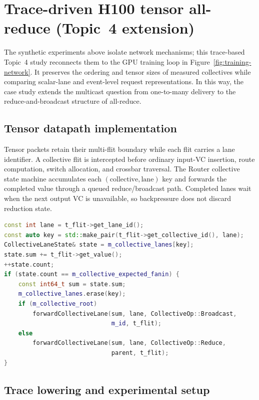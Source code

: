 \documentclass[10pt]{article}
\newcommand{\FloatBarrier}{\par}
\begin{document}
\FloatBarrier

\section{Trace-driven H100 tensor all-reduce (Topic~4 extension)}

The synthetic experiments above isolate network mechanisms; this trace-based
Topic~4 study reconnects them to the GPU training loop in
Figure~\ref{fig:training-network}.  It preserves the ordering and tensor sizes
of measured collectives while comparing scalar-lane and event-level request
representations.  In this way, the case study extends the multicast question
from one-to-many delivery to the reduce-and-broadcast structure of all-reduce.

\subsection{Tensor datapath implementation}

Tensor packets retain their multi-flit boundary while each flit carries a lane
identifier.  A collective flit is intercepted before ordinary input-VC
insertion, route computation, switch allocation, and crossbar traversal.  The
Router collective state machine accumulates each
$(\text{collective},\text{lane})$ key and forwards the completed value through
a queued reduce/broadcast path.  Completed lanes wait when the next output VC
is unavailable, so backpressure does not discard reduction state.

\begin{lstlisting}[language=C++,caption={Abridged source excerpt: lane-wise tensor accumulation (\texttt{Router.cc}).},label={lst:tensor}]
const int lane = t_flit->get_lane_id();
const auto key = std::make_pair(t_flit->get_collective_id(), lane);
CollectiveLaneState& state = m_collective_lanes[key];
state.sum += t_flit->get_value();
++state.count;
if (state.count == m_collective_expected_fanin) {
    const int64_t sum = state.sum;
    m_collective_lanes.erase(key);
    if (m_collective_root)
        forwardCollectiveLane(sum, lane, CollectiveOp::Broadcast,
                              m_id, t_flit);
    else
        forwardCollectiveLane(sum, lane, CollectiveOp::Reduce,
                              parent, t_flit);
}
\end{lstlisting}

\subsection{Trace lowering and experimental setup}
\end{document}

